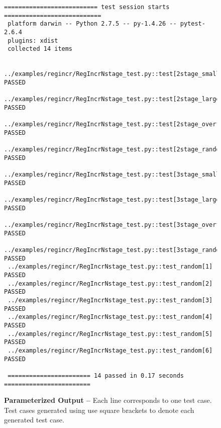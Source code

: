 
\begin{figure}

  \footnotesize
  \begin{Verbatim}[xleftmargin=0.8in]
 ========================== test session starts ===========================
 platform darwin -- Python 2.7.5 -- py-1.4.26 -- pytest-2.6.4
 plugins: xdist
 collected 14 items

 ../examples/regincr/RegIncrNstage_test.py::test[2stage_small] PASSED
 ../examples/regincr/RegIncrNstage_test.py::test[2stage_large] PASSED
 ../examples/regincr/RegIncrNstage_test.py::test[2stage_overflow] PASSED
 ../examples/regincr/RegIncrNstage_test.py::test[2stage_random] PASSED
 ../examples/regincr/RegIncrNstage_test.py::test[3stage_small] PASSED
 ../examples/regincr/RegIncrNstage_test.py::test[3stage_large] PASSED
 ../examples/regincr/RegIncrNstage_test.py::test[3stage_overflow] PASSED
 ../examples/regincr/RegIncrNstage_test.py::test[3stage_random] PASSED
 ../examples/regincr/RegIncrNstage_test.py::test_random[1] PASSED
 ../examples/regincr/RegIncrNstage_test.py::test_random[2] PASSED
 ../examples/regincr/RegIncrNstage_test.py::test_random[3] PASSED
 ../examples/regincr/RegIncrNstage_test.py::test_random[4] PASSED
 ../examples/regincr/RegIncrNstage_test.py::test_random[5] PASSED
 ../examples/regincr/RegIncrNstage_test.py::test_random[6] PASSED

 ======================= 14 passed in 0.17 seconds ========================
  \end{Verbatim}
  \vspace{-0.1in}

  \caption{\textbf{ Parameterized Output --} Each line
    corresponds to one test case. Test cases generated using
     use square brackets to denote each
    generated test case.}
  \label{fig-tut3-pytest-param-output}

\end{figure}
